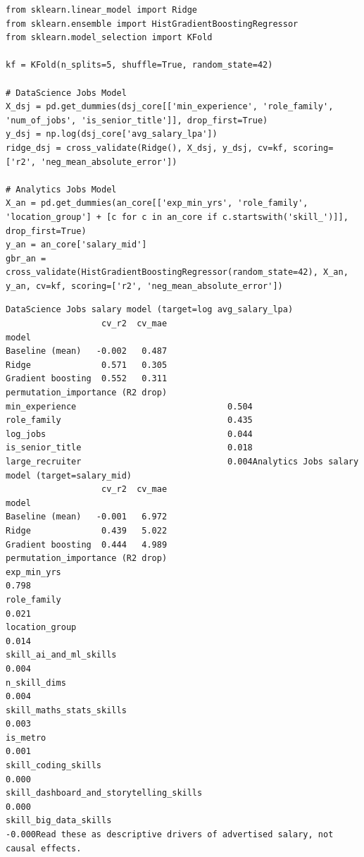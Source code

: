 \documentclass[conference]{IEEEtran}
\begin{document}
\begin{lstlisting}[style=pythonstyle,caption={Cross-validated Ridge and HistGradientBoosting regressions with permutation importances.},label={lst:salary_reg_code}]
from sklearn.linear_model import Ridge
from sklearn.ensemble import HistGradientBoostingRegressor
from sklearn.model_selection import KFold

kf = KFold(n_splits=5, shuffle=True, random_state=42)

# DataScience Jobs Model
X_dsj = pd.get_dummies(dsj_core[['min_experience', 'role_family', 'num_of_jobs', 'is_senior_title']], drop_first=True)
y_dsj = np.log(dsj_core['avg_salary_lpa'])
ridge_dsj = cross_validate(Ridge(), X_dsj, y_dsj, cv=kf, scoring=['r2', 'neg_mean_absolute_error'])

# Analytics Jobs Model
X_an = pd.get_dummies(an_core[['exp_min_yrs', 'role_family', 'location_group'] + [c for c in an_core if c.startswith('skill_')]], drop_first=True)
y_an = an_core['salary_mid']
gbr_an = cross_validate(HistGradientBoostingRegressor(random_state=42), X_an, y_an, cv=kf, scoring=['r2', 'neg_mean_absolute_error'])
\end{lstlisting}

\begin{lstlisting}[style=outputstyle,caption={Execution Output G.12: Salary Regression Benchmarks and Feature Importance.},label={out:salary_reg}]
DataScience Jobs salary model (target=log avg_salary_lpa)
                   cv_r2  cv_mae
model                           
Baseline (mean)   -0.002   0.487
Ridge              0.571   0.305
Gradient boosting  0.552   0.311                 permutation_importance (R2 drop)
min_experience                              0.504
role_family                                 0.435
log_jobs                                    0.044
is_senior_title                             0.018
large_recruiter                             0.004Analytics Jobs salary model (target=salary_mid)
                   cv_r2  cv_mae
model                           
Baseline (mean)   -0.001   6.972
Ridge              0.439   5.022
Gradient boosting  0.444   4.989                                         permutation_importance (R2 drop)
exp_min_yrs                                                         0.798
role_family                                                         0.021
location_group                                                      0.014
skill_ai_and_ml_skills                                              0.004
n_skill_dims                                                        0.004
skill_maths_stats_skills                                            0.003
is_metro                                                            0.001
skill_coding_skills                                                 0.000
skill_dashboard_and_storytelling_skills                             0.000
skill_big_data_skills                                              -0.000Read these as descriptive drivers of advertised salary, not causal effects.
\end{lstlisting}
\end{document}
